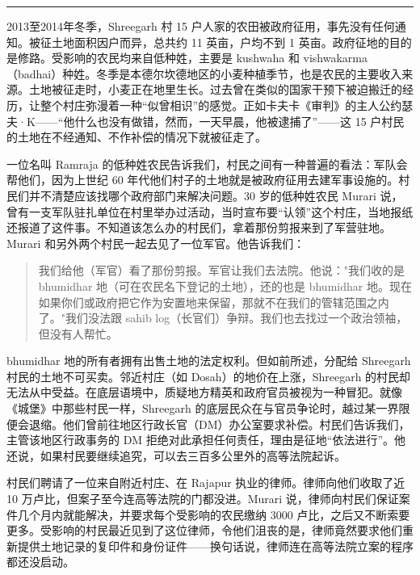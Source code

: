 \documentclass[12pt,a4paper]{article}
\begin{document}
\noindent\rule{\textwidth}{0.4pt}

\vspace{0.3em}



2013至2014年冬季，Shreegarh 村 15 户人家的农田被政府征用，事先没有任何通知。被征土地面积因户而异，总共约 11 英亩，户均不到 1 英亩。政府征地的目的是修路。受影响的农民均来自低种姓，主要是 kushwaha 和 vishwakarma（badhai）种姓。冬季是本德尔坎德地区的小麦种植季节，也是农民的主要收入来源。土地被征走时，小麦正在地里生长。过去曾在类似的国家干预下被迫搬迁的经历，让整个村庄弥漫着一种“似曾相识”的感觉。正如卡夫卡《审判》的主人公约瑟夫·K——“他什么也没有做错，然而，一天早晨，他被逮捕了”——这 15 户村民的土地在不经通知、不作补偿的情况下就被征走了。



一位名叫 Ramraja 的低种姓农民告诉我们，村民之间有一种普遍的看法：军队会帮他们，因为上世纪 60 年代他们村子的土地就是被政府征用去建军事设施的。村民们并不清楚应该找哪个政府部门来解决问题。30 岁的低种姓农民 Murari 说，曾有一支军队驻扎单位在村里举办过活动，当时宣布要“认领”这个村庄，当地报纸还报道了这件事。不知道该怎么办的村民们，拿着那份剪报来到了军营驻地。Murari 和另外两个村民一起去见了一位军官。他告诉我们：



\begin{quotation}\kaifont\noindent 我们给他（军官）看了那份剪报。军官让我们去法院。他说："我们收的是 bhumidhar 地（可在农民名下登记的土地），还的也是 bhumidhar 地。现在如果你们或政府把它作为安置地来保留，那就不在我们的管辖范围之内了。"我们没法跟 sahib log（长官们）争辩。我们也去找过一个政治领袖，但没有人帮忙。\end{quotation}



bhumidhar 地的所有者拥有出售土地的法定权利。但如前所述，分配给 Shreegarh 村民的土地不可买卖。邻近村庄（如 Dosah）的地价在上涨，Shreegarh 的村民却无法从中受益。在底层语境中，质疑地方精英和政府官员被视为一种冒犯。就像《城堡》中那些村民一样，Shreegarh 的底层民众在与官员争论时，越过某一界限便会退缩。他们曾前往地区行政长官（DM）办公室要求补偿。村民们告诉我们，主管该地区行政事务的 DM 拒绝对此承担任何责任，理由是征地“依法进行”。他还说，如果村民要继续追究，可以去三百多公里外的高等法院起诉。



村民们聘请了一位来自附近村庄、在 Rajapur 执业的律师。律师向他们收取了近 10 万卢比，但案子至今连高等法院的门都没进。Murari 说，律师向村民们保证案件几个月内就能解决，并要求每个受影响的农民缴纳 3000 卢比，之后又不断索要更多。受影响的村民最近见到了这位律师，令他们沮丧的是，律师竟然要求他们重新提供土地记录的复印件和身份证件——换句话说，律师连在高等法院立案的程序都还没启动。
\end{document}
